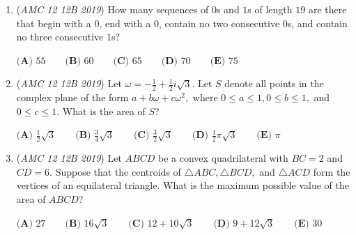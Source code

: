 \begin{enumerate}
 $\textbf{(A) } [9,26] \qquad\textbf{(B) } [27,80] \qquad\textbf{(C) } [81,242]\qquad\textbf{(D) } [243,728] \qquad\textbf{(E) } [729,\infty]$


	\item (\textit{AMC 12 12B 2019}) How many sequences of $0$s and $1$s of length $19$ are there that begin with a $0$, end with a $0$, contain no two consecutive $0$s, and contain no three consecutive $1$s?


 $\textbf{(A) }55\qquad\textbf{(B) }60\qquad\textbf{(C) }65\qquad\textbf{(D) }70\qquad\textbf{(E) }75$


	\item (\textit{AMC 12 12B 2019}) Let $\omega=-\frac{1}{2}+\frac{1}{2}i\sqrt3.$ Let $S$ denote all points in the complex plane of the form $a+b\omega+c\omega^2,$ where $0\leq a \leq 1,0\leq b\leq 1,$ and $0\leq c\leq 1.$ What is the area of $S$?


 $\textbf{(A) } \frac{1}{2}\sqrt3 \qquad\textbf{(B) } \frac{3}{4}\sqrt3 \qquad\textbf{(C) } \frac{3}{2}\sqrt3\qquad\textbf{(D) } \frac{1}{2}\pi\sqrt3 \qquad\textbf{(E) } \pi$


	\item (\textit{AMC 12 12B 2019}) Let $ABCD$ be a convex quadrilateral with $BC=2$ and $CD=6.$ Suppose that the centroids of $\triangle ABC,\triangle BCD,$ and $\triangle ACD$ form the vertices of an equilateral triangle. What is the maximum possible value of the area of $ABCD$?


 $\textbf{(A) } 27 \qquad\textbf{(B) } 16\sqrt3 \qquad\textbf{(C) } 12+10\sqrt3 \qquad\textbf{(D) } 9+12\sqrt3 \qquad\textbf{(E) } 30$


\end{enumerate}